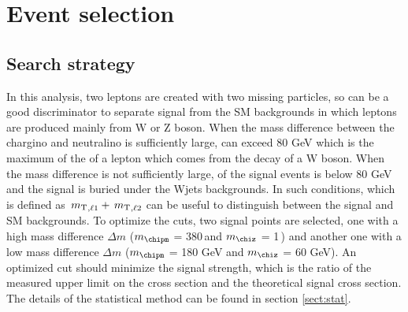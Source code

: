 \section{Event selection}
\label{sect:cuts}
\subsection{Search strategy}
In this analysis, two leptons are created with two missing particles, so \mttwo can be a good discriminator to separate signal 
from the SM backgrounds in which leptons are produced mainly from W or Z boson. When the mass difference between the chargino and neutralino 
is sufficiently large, \mttwo can exceed 80 GeV which is the maximum of the \mt of a lepton which comes from the decay of a W boson.
When the mass difference is not sufficiently large, \mttwo of the signal events is below 80 GeV and the signal is buried under the Wjets
backgrounds. In such conditions, \SumMT which is defined as $\,{m_{\rm T}}_{,\ell1} + \,{m_{\rm T}}_{,\ell2}$ can be useful to distinguish between the signal and 
SM backgrounds.
To optimize the cuts, two signal points are selected, one with a high mass difference 
$\Delta m$ ($m_{\chipm}$ = 380\,\GeV and $m_{\chiz}$ = 1\,\GeV) %
and another one with a low mass difference 
$\Delta m$ ($m_{\chipm}$ = 180 GeV and $m_{\chiz}$ = 60 GeV). %
An optimized cut should minimize the signal strength, 
which is the ratio of the measured upper limit on the cross section and the theoretical signal cross section. The details of the statistical 
method can be found in section \ref{sect:stat}.

